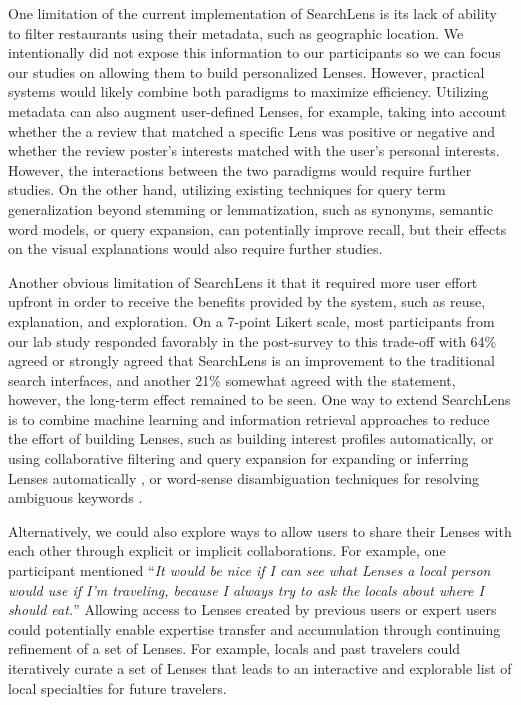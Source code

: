 One limitation of the current implementation of SearchLens is its lack of ability to filter restaurants using their metadata, such as geographic location. We intentionally did not expose this information to our participants so we can focus our studies on allowing them to build personalized Lenses. However, practical systems would likely combine both paradigms to maximize efficiency. Utilizing metadata can also augment user-defined Lenses, for example, taking into account whether the a review that matched a specific Lens was positive or negative and whether the review poster's interests matched with the user's personal interests. However, the interactions between the two paradigms would require further studies. On the other hand, utilizing existing techniques for query term generalization beyond stemming or lemmatization, such as synonyms, semantic word models, or query expansion, can potentially improve recall, but their effects on the visual explanations would also require further studies.

Another obvious limitation of SearchLens it that it required more user effort upfront in order to receive the benefits provided by the system, such as reuse, explanation, and exploration. On a 7-point Likert scale, most participants from our lab study responded favorably in the post-survey to this trade-off with 64\% agreed or strongly agreed that SearchLens is an improvement to the traditional search interfaces, and another 21\% somewhat agreed with the statement, however, the long-term effect remained to be seen. One way to extend SearchLens is to combine machine learning and information retrieval approaches to reduce the effort of building Lenses, such as building interest profiles automatically, or using collaborative filtering and query expansion for expanding or inferring Lenses automatically \cite{ahn2007open,sarwar2001item,xu1996query}, or word-sense disambiguation techniques for resolving ambiguous keywords \cite{yarowsky1995unsupervised}.

Alternatively, we could also explore ways to allow users to share their Lenses with each other through explicit or implicit collaborations. For example, one participant mentioned ``\emph{It would be nice if I can see what Lenses a local person would use if I'm traveling, because I always try to ask the locals about where I should eat.}'' Allowing access to Lenses created by previous users or expert users could potentially enable expertise transfer and accumulation through continuing refinement of a set of Lenses. For example, locals and past travelers could iteratively curate a set of Lenses that leads to an interactive and explorable list of local specialties for future travelers.

